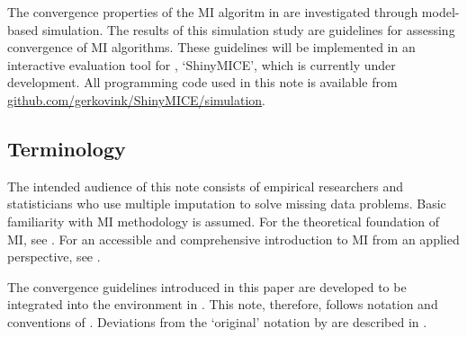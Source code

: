 \documentclass[article]{jss}
\begin{document}

The convergence properties of the MI algoritm in  are investigated through model-based simulation. The results of this simulation study are guidelines for assessing convergence of MI algorithms. These guidelines will be implemented in an interactive evaluation tool for , `ShinyMICE', which is currently under development. All programming code used in this note is available from \href{https://github.com/gerkovink/shinyMice/simulation}{github.com/gerkovink/ShinyMICE/simulation}. 


\subsection{Terminology} \label{sec:terms}

The intended audience of this note consists of empirical researchers and statisticians who use multiple imputation to solve missing data problems. Basic familiarity with MI methodology is assumed. For the theoretical foundation of MI, see \cite{rubin87}. For an accessible and comprehensive introduction to MI from an applied perspective, see \cite{buur18}.  

The convergence guidelines introduced in this paper are developed to be integrated into the  environment \citep{mice} in  \citep{R}. This note, therefore, follows notation and conventions of \cite{mice}. Deviations from the `original' notation by \cite{rubin87} are described in \citep[\S~2.2.3]{buur18}. 
\end{document}
